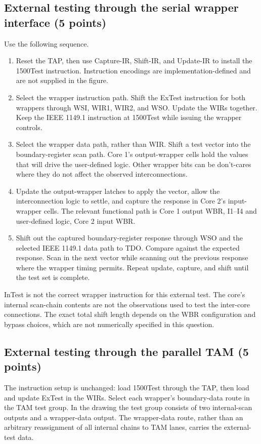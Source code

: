 \subsection{External testing through the serial wrapper interface (5 points)}
\answer Use the following sequence.
\begin{enumerate}
\item Reset the TAP, then use Capture-IR, Shift-IR, and Update-IR to install the 1500Test instruction. Instruction encodings are implementation-defined and are not supplied in the figure.
\item Select the wrapper instruction path. Shift the ExTest instruction for both wrappers through WSI, WIR1, WIR2, and WSO. Update the WIRs together. Keep the IEEE 1149.1 instruction at 1500Test while issuing the wrapper controls.
\item Select the wrapper data path, rather than WIR. Shift a test vector into the boundary-register scan path. Core 1's output-wrapper cells hold the values that will drive the user-defined logic. Other wrapper bits can be don't-cares where they do not affect the observed interconnections.
\item Update the output-wrapper latches to apply the vector, allow the interconnection logic to settle, and capture the response in Core 2's input-wrapper cells. The relevant functional path is Core 1 output WBR, I1--I4 and user-defined logic, Core 2 input WBR.
\item Shift out the captured boundary-register response through WSO and the selected IEEE 1149.1 data path to TDO. Compare against the expected response. Scan in the next vector while scanning out the previous response where the wrapper timing permits. Repeat update, capture, and shift until the test set is complete.
\end{enumerate}
InTest is not the correct wrapper instruction for this external test. The core's internal scan-chain contents are not the observations used to test the inter-core connections. The exact total shift length depends on the WBR configuration and bypass choices, which are not numerically specified in this question.

\subsection{External testing through the parallel TAM (5 points)}
\answer The instruction setup is unchanged: load 1500Test through the TAP, then load and update ExTest in the WIRs. Select each wrapper's boundary-data route in the TAM test group. In the drawing the test group consists of two internal-scan outputs and a wrapper-data output. The wrapper-data route, rather than an arbitrary reassignment of all internal chains to TAM lanes, carries the external-test data.

